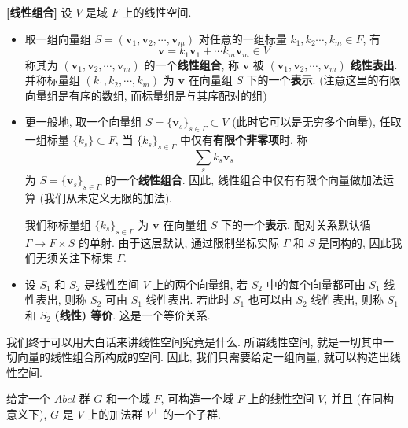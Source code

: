 \documentclass[UTF8]{book}
\begin{document}
\begin{definition}
    \textbf{[线性组合]} 
    设 $V$ 是域 $F$ 上的线性空间. 
    \begin{itemize}
        \item 取一组向量组 
        $S=(\boldsymbol{v}_1,\boldsymbol{v}_2,\cdots,\boldsymbol{v}_m)$ 
        对任意的一组标量 $k_1,k_2\cdots,k_m \in F$, 
        有 
        $$\boldsymbol{v} = k_1\boldsymbol{v}_1 + \cdots k_m\boldsymbol{v}_m 
        \in V$$
        称其为 $(\boldsymbol{v}_1,\boldsymbol{v}_2,\cdots,\boldsymbol{v}_m)$ 
        的一个\textbf{线性组合}, 
        称 $\boldsymbol{v}$ 被 
        $(\boldsymbol{v}_1,\boldsymbol{v}_2,\cdots,\boldsymbol{v}_m)$ 
        \textbf{线性表出}. 
        并称标量组 $(k_1,k_2,\cdots,k_m)$ 为 $\boldsymbol{v}$ 
        在向量组 $S$ 下的一个\textbf{表示}. 
        (注意这里的有限向量组是有序的数组, 而标量组是与其序配对的组)

        \item 更一般地, 取一个向量组 $S = \{\boldsymbol{v}_{s}\}_{s\in \Gamma} \subset V$ 
        (此时它可以是无穷多个向量), 任取一组标量 $\{k_{s}\}\subset F$, 
        当 $\{k_{s}\}_{s\in \Gamma}$ 中仅有\textbf{有限个非零项}时, 称
        $$ \sum_{s}k_s \boldsymbol{v}_s $$ 
        为 $S = \{\boldsymbol{v}_{s}\}_{s\in \Gamma}$ 的一个\textbf{线性组合}. 
        因此, 线性组合中仅有有限个向量做加法运算 (我们从未定义无限的加法). 
        
        我们称标量组 $\{k_{s}\}_{s\in \Gamma}$ 为 $\boldsymbol{v}$ 
        在向量组 $S$ 下的一个\textbf{表示}, 
        配对关系默认循 $\Gamma \to F\times S$ 的单射. 
        由于这层默认, 通过限制坐标实际 $\Gamma$ 和 $S$ 是同构的, 
        因此我们无须关注下标集 $\Gamma$. 

        \item 设 $S_1$ 和 $S_2$ 是线性空间 $V$ 上的两个向量组, 
        若 $S_2$ 中的每个向量都可由 $S_1$ 线性表出, 则称 $S_2$ 可由 $S_1$ 
        线性表出. 若此时 $S_1$ 也可以由 $S_2$ 线性表出, 
        则称 $S_1$ 和 $S_2$ \textbf{(线性) 等价}. 这是一个等价关系. 
    \end{itemize}
    
\end{definition}

我们终于可以用大白话来讲线性空间究竟是什么. 
所谓线性空间, 就是一切其中一切向量的线性组合所构成的空间. 
因此, 我们只需要给定一组向量, 就可以构造出线性空间. 

\begin{lemma}
    给定一个 $Abel$ 群 $G$ 和一个域 $F$, 
    可构造一个域 $F$ 上的线性空间 $V$, 
    并且 (在同构意义下), $G$ 是 $V$ 上的加法群 $V^+$ 的一个子群.  
\end{lemma}
\end{document}
